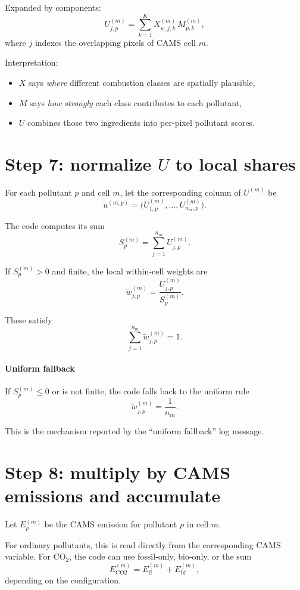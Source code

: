 \documentclass[11pt,a4paper]{article}
\begin{document}
Expanded by components:
\[
U^{(m)}_{j,p}
= \sum_{k=1}^K X^{(m)}_{w,j,k} \, M^{(m)}_{p,k},
\]
where $j$ indexes the overlapping pixels of CAMS cell $m$.

Interpretation:

\begin{itemize}[leftmargin=1.4em]
  \item $X$ says \emph{where} different combustion classes are spatially plausible,
  \item $M$ says \emph{how strongly} each class contributes to each pollutant,
  \item $U$ combines those two ingredients into per-pixel pollutant scores.
\end{itemize}

\section{Step 7: normalize $U$ to local shares}

For each pollutant $p$ and cell $m$, let the corresponding column of $U^{(m)}$ be
\[
u^{(m,p)} = \bigl(U^{(m)}_{1,p}, \dots, U^{(m)}_{n_m,p}\bigr).
\]

The code computes its sum
\[
S^{(m)}_p = \sum_{j=1}^{n_m} U^{(m)}_{j,p}.
\]

If $S^{(m)}_p > 0$ and finite, the local within-cell weights are
\[
\widetilde{w}^{(m)}_{j,p} = \frac{U^{(m)}_{j,p}}{S^{(m)}_p}.
\]

These satisfy
\[
\sum_{j=1}^{n_m} \widetilde{w}^{(m)}_{j,p} = 1.
\]

\paragraph{Uniform fallback}
If $S^{(m)}_p \le 0$ or is not finite, the code falls back to the uniform rule
\[
\widetilde{w}^{(m)}_{j,p} = \frac{1}{n_m}.
\]

This is the mechanism reported by the ``uniform fallback'' log message.

\section{Step 8: multiply by CAMS emissions and accumulate}

Let $E_p^{(m)}$ be the CAMS emission for pollutant $p$ in cell $m$.

For ordinary pollutants, this is read directly from the corresponding CAMS variable.
For CO$_2$, the code can use fossil-only, bio-only, or the sum
\[
E_{\mathrm{CO2}}^{(m)} =
E_{\mathrm{ff}}^{(m)} + E_{\mathrm{bf}}^{(m)},
\]
depending on the configuration.
\end{document}
